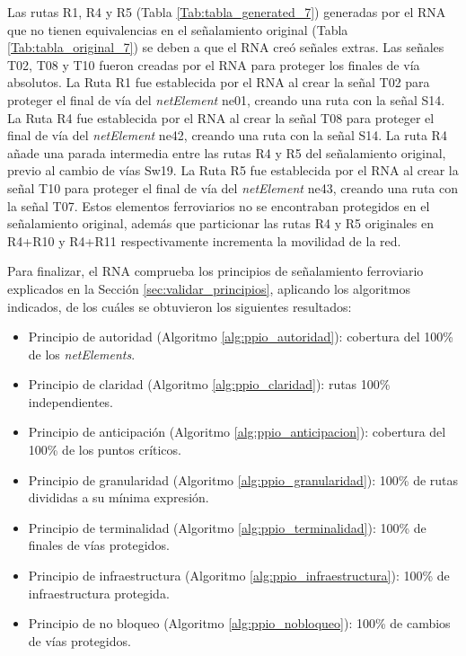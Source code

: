      Las rutas R1, R4 y R5 (Tabla \ref{Tab:tabla_generated_7}) generadas por el RNA que no tienen equivalencias en el señalamiento original (Tabla \ref{Tab:tabla_original_7}) se deben a que el RNA creó señales extras. Las señales T02, T08 y T10 fueron creadas por el RNA para proteger los finales de vía absolutos. La Ruta R1 fue establecida por el RNA al crear la señal T02 para proteger el final de vía del \textit{netElement} ne01, creando una ruta con la señal S14. La Ruta R4 fue establecida por el RNA al crear la señal T08 para proteger el final de vía del \textit{netElement} ne42, creando una ruta con la señal S14. La ruta R4 añade una parada intermedia entre las rutas R4 y R5 del señalamiento original, previo al cambio de vías Sw19. La Ruta R5 fue establecida por el RNA al crear la señal T10 para proteger el final de vía del \textit{netElement} ne43, creando una ruta con la señal T07. Estos elementos ferroviarios no se encontraban protegidos en el señalamiento original, además que particionar las rutas R4 y R5 originales en R4+R10 y R4+R11 respectivamente incrementa la movilidad de la red.
     
     Para finalizar, el RNA comprueba los principios de señalamiento ferroviario explicados en la Sección \ref{sec:validar_principios}, aplicando los algoritmos indicados, de los cuáles se obtuvieron los siguientes resultados:
     
     \begin{itemize}
     	\item Principio de autoridad (Algoritmo \ref{alg:ppio_autoridad}): cobertura del 100\% de los \textit{netElements}.
     	\item Principio de claridad (Algoritmo \ref{alg:ppio_claridad}): rutas 100\% independientes.
     	\item Principio de anticipación (Algoritmo \ref{alg:ppio_anticipacion}): cobertura del 100\% de los puntos críticos.
     	\item Principio de granularidad (Algoritmo \ref{alg:ppio_granularidad}): 100\% de rutas divididas a su mínima expresión.
     	\item Principio de terminalidad (Algoritmo \ref{alg:ppio_terminalidad}): 100\% de finales de vías protegidos.
     	\item Principio de infraestructura (Algoritmo \ref{alg:ppio_infraestructura}): 100\% de infraestructura protegida.
     	\item Principio de no bloqueo (Algoritmo \ref{alg:ppio_nobloqueo}): 100\% de cambios de vías protegidos.
     \end{itemize}	